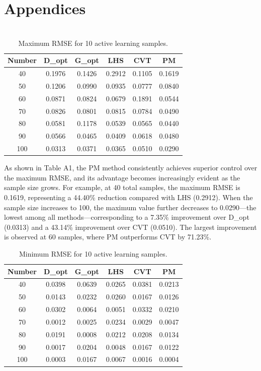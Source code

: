 \documentclass[]{interact}
\theoremstyle{plain}%
\theoremstyle{definition}
\theoremstyle{remark}
\begin{document}
\section{Appendices}

\appendix

\section{ }

\begin{table}[h!]
	\centering
	\caption{Maximum RMSE for 10 active learning samples.}
	\begin{tabular}{cccccc}
		\toprule
		Number & D\_opt & G\_opt & LHS & CVT & PM \\
		\midrule
		40 & 0.1976 & 0.1426 & 0.2912 & 0.1105 & 0.1619 \\
		50 & 0.1206 & 0.0990 & 0.0935 & 0.0777 & 0.0840 \\
		60 & 0.0871 & 0.0824 & 0.0679 & 0.1891 & 0.0544 \\
		70 & 0.0826 & 0.0801 & 0.0815 & 0.0784 & 0.0490 \\
		80 & 0.0581 & 0.1178 & 0.0539 & 0.0565 & 0.0440 \\
		90 & 0.0566 & 0.0465 & 0.0409 & 0.0618 & 0.0480 \\
		100 & 0.0313 & 0.0371 & 0.0365 & 0.0510 & 0.0290 \\
		\bottomrule
	\end{tabular}
\end{table}

As shown in Table A1, the PM method consistently achieves superior control over the maximum RMSE, and its advantage becomes increasingly evident as the sample size grows. For example, at 40 total samples, the maximum RMSE is 0.1619, representing a 44.40\% reduction compared with LHS (0.2912). When the sample size increases to 100, the maximum value further decreases to 0.0290—the lowest among all methods—corresponding to a 7.35\% improvement over D\_opt (0.0313) and a 43.14\% improvement over CVT (0.0510). The largest improvement is observed at 60 samples, where PM outperforms CVT by 71.23\%.

\begin{table}[h!]
	\centering
	\caption{Minimum RMSE for 10 active learning samples.}
	\begin{tabular}{cccccc}
		\toprule
		Number & D\_opt & G\_opt & LHS & CVT & PM \\
		\midrule
		40 & 0.0398 & 0.0639 & 0.0265 & 0.0381 & 0.0213 \\
		50 & 0.0143 & 0.0232 & 0.0260 & 0.0167 & 0.0126 \\
		60 & 0.0302 & 0.0064 & 0.0051 & 0.0332 & 0.0210 \\
		70 & 0.0012 & 0.0025 & 0.0234 & 0.0029 & 0.0047 \\
		80 & 0.0191 & 0.0008 & 0.0212 & 0.0208 & 0.0134 \\
		90 & 0.0017 & 0.0204 & 0.0048 & 0.0167 & 0.0122 \\
		100 & 0.0003 & 0.0167 & 0.0067 & 0.0016 & 0.0004 \\
		\bottomrule
	\end{tabular}
\end{table}
\end{document}
